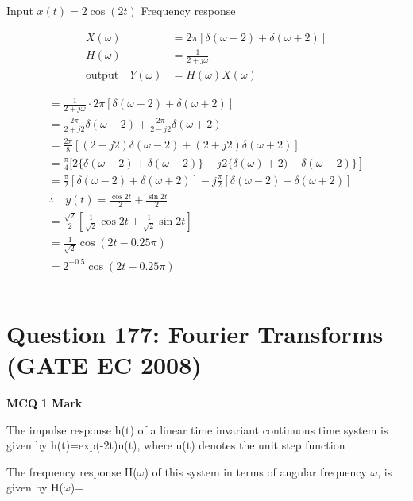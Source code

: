 \documentclass[11pt,a4paper]{article}
\begin{document}
\begin{tcolorbox}[solbox, title=Detailed Solution -- Question 176]
Input $x(t)=2 \cos (2 t)$
 Frequency response

\[
\begin{aligned} X(\omega)&=2 \pi[\delta(\omega-2)+\delta(\omega+2)]\\ H(\omega)&=\frac{1}{2+j \omega} \\ \text{output}\quad Y(\omega)&=H(\omega) X(\omega) \end{aligned}
\]

\[
\begin{array}{l} =\frac{1}{2+j \omega} \cdot 2 \pi[\delta(\omega-2)+\delta(\omega+2)] \\ =\frac{2 \pi}{2+j 2} \delta(\omega-2)+\frac{2 \pi}{2-j 2} \delta(\omega+2) \\ =\frac{2 \pi}{8}[(2-j 2) \delta(\omega-2)+(2+j 2) \delta(\omega+2)] \\ \left.=\frac{\pi}{4}[2\{\delta(\omega-2)+\delta(\omega+2)\}+j 2\{\delta(\omega)+2)-\delta(\omega-2)\}\right] \\ =\frac{\pi}{2}[\delta(\omega-2)+\delta(\omega+2)]-j \frac{\pi}{2}[\delta(\omega-2)-\delta(\omega+2)] \\ \therefore \quad y(t)=\frac{\cos 2 t}{2}+\frac{\sin 2 t}{2} \\ =\frac{\sqrt{2}}{2}\left[\frac{1}{\sqrt{2}} \cos 2 t+\frac{1}{\sqrt{2}} \sin 2 t\right] \\ =\frac{1}{\sqrt{2}} \cos (2 t-0.25 \pi) \\ =2^{-0.5} \cos (2 t-0.25 \pi) \end{array}
\]
\end{tcolorbox}

\vspace{1.5em}
\hrule
\vspace{1.5em}

\section*{Question 177: Fourier Transforms (GATE EC 2008)}
\noindent \textbf{\color{primary}MCQ} \hfill \textbf{\color{secondary}1 Mark}


\noindent The impulse response h(t) of a linear time invariant continuous time system is
given by  
h(t)=exp(-2t)u(t), where u(t) denotes the unit step function 

The frequency response H($\omega$) of this system in terms of angular frequency $\omega$, is given by H($\omega$)=
\end{document}
